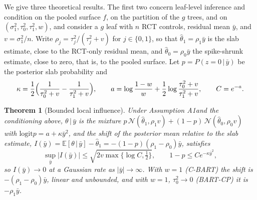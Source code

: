 \documentclass[11pt]{article}
\newcommand{\E}{\mathbb{E}}
\newcommand{\Normal}{\mathcal{N}}
\newcommand{\logit}{\mathrm{logit}}
\newcommand{\given}{\,\vert\,}
\newtheorem{theorem}{Theorem}
\theoremstyle{definition}
\theoremstyle{plain}
\providecommand{\DIFaddtex}[1]{{\protect\color{blue}\uwave{#1}}} %
\providecommand{\DIFaddbegin}{} %
\providecommand{\DIFaddend}{} %
\providecommand{\DIFadd}[1]{\texorpdfstring{\DIFaddtex{#1}}{#1}} %
\newcommand{\DIFaddincludegraphics}[2][]{{\color{blue}\fbox{\DIFOincludegraphics[#1]{#2}}}} %
\DeclareRobustCommand{\DIFaddbegin}{\DIFOaddbegin \let\includegraphics\DIFaddincludegraphics} %
\DeclareRobustCommand{\DIFaddend}{\DIFOaddend \let\includegraphics\DIFOincludegraphics} %
\begin{document}
We give three theoretical results. The first two concern leaf-level inference and condition on the pooled surface $f$, on the partition of the $g$ trees, and on $(\sigma_1^2,\tau_0^2,\tau_1^2,w)$, and consider a $g$ leaf with $n$ RCT controls, residual mean $\bar y$, and $v=\sigma_1^2/n$. Write $\rho_j=\tau_j^2/(\tau_j^2+v)$ for $j\in\{0,1\}$, so that $\hat\theta_1=\rho_1\bar y$ is the slab estimate, close to the RCT-only residual mean, and $\hat\theta_0=\rho_0\bar y$ the spike-shrunk estimate, close to zero, that is, to the pooled surface. Let $p=P(z=0\given\bar y)$ be the posterior slab probability and
\begin{equation}
\kappa=\frac{1}{2}\Bigl(\frac{1}{\tau_0^2+v}-\frac{1}{\tau_1^2+v}\Bigr),\qquad
a=\log\frac{1-w}{w}+\frac{1}{2}\log\frac{\tau_0^2+v}{\tau_1^2+v},\qquad C=e^{-a}.
\label{eq:kappa}
\end{equation}

\begin{theorem}[Bounded local influence]\label{thm:influence}
Under Assumption A1\DIFaddbegin \DIFadd{, $0<w<1$, }\DIFaddend and the conditioning above, $\theta\given\bar y$ is the mixture $p\,\Normal(\hat\theta_1,\rho_1v)+(1-p)\,\Normal(\hat\theta_0,\rho_0v)$ with $\logit p=a+\kappa\bar y^2$, and the shift of the posterior mean relative to the slab estimate, $I(\bar y)=\E[\theta\given\bar y]-\hat\theta_1=-(1-p)(\rho_1-\rho_0)\bar y$, satisfies
\[
\sup_{\bar y}|I(\bar y)|\le\sqrt{2v\max\{\log C,\tfrac12\}},\qquad 1-p\le Ce^{-\kappa\bar y^2},
\]
so $I(\bar y)\to0$ at a Gaussian rate as $|\bar y|\to\infty$. With $w=1$ (C-BART) the shift is $-(\rho_1-\rho_0)\bar y$, linear and unbounded, and with $w=1$, $\tau_0^2\to0$ (BART-CP) it is $-\rho_1\bar y$.
\end{theorem}
\end{document}
